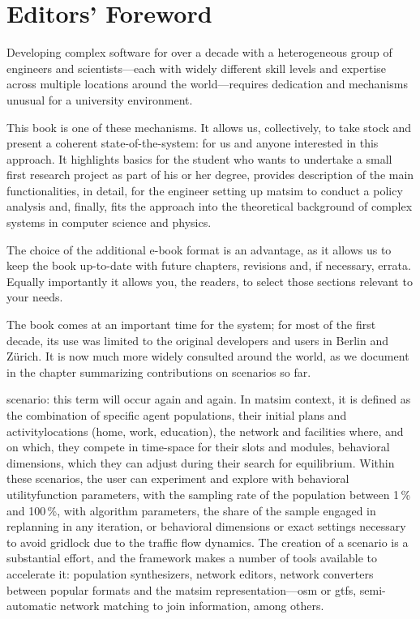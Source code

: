 \chapter*{Editors' Foreword}



Developing complex software for over a decade with a heterogeneous group of engineers and scientists---each with widely different skill levels and expertise across multiple locations around the world---requires dedication and mechanisms unusual for a university environment. 

This book is one of these mechanisms. It allows us, collectively, to take stock and present a coherent state-of-the-system: for us and anyone interested in this approach. It highlights  basics for the student who wants to undertake a small first research project as part of his or her degree, provides description of the main functionalities, in detail, for the engineer setting up \gls{matsim} to conduct a policy analysis and, finally, fits the approach into the theoretical background of complex systems in computer science and physics. 

The choice of the additional e-book format is an advantage, as it allows us to keep the book up-to-date with future chapters, revisions and, if necessary, errata. Equally importantly it allows you, the readers, to select those sections relevant to your needs. 

The book comes at an important time for the system; for most of the first decade, its use was limited to the original developers and users in Berlin and Zürich. It is now much more widely consulted around the world, as we document in the chapter summarizing contributions on \glspl{scenario} so far. 

\Gls{scenario}: this term will occur again and again. In \gls{matsim} context, it is defined as the combination of specific agent populations, their initial \glspl{plan} and \glspl{activitylocation} (home, work, education), the network and facilities where, and on which, they compete in time-space for their slots and modules, \ie behavioral dimensions, which they can adjust during their search for equilibrium. Within these \glspl{scenario}, the user can experiment and explore with behavioral \gls{utilityfunction} parameters, with the sampling rate of the population between 1\,\% and 100\,\%, with algorithm parameters, \eg the share of the sample engaged in \gls{replanning} in any \gls{iteration}, or behavioral dimensions or exact settings necessary to avoid gridlock due to the traffic flow dynamics.
The creation of a \gls{scenario} is a substantial effort, and the \gls{framework} makes a number of tools available to accelerate it: population synthesizers, network editors, network converters between popular formats and the \gls{matsim} representation---\eg \gls{osm} or \gls{gtfs}, semi-automatic network matching to join information, among others.

